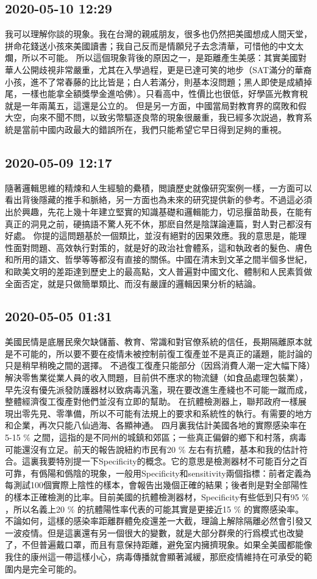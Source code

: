 \documentclass[twocolumn]{ctexart}
\begin{document}
\subsection*{2020-05-10 12:29}

我可以理解你談的現象。我在台灣的親戚朋友，很多也仍然把美國想成人間天堂，拼命花錢送小孩來美國讀書；我自己反而是情願兒子去念清華，可惜他的中文太爛，所以不可能。
所以這個現象背後的原因之一，是距離產生美感：其實美國對華人公開歧視非常嚴重，尤其在入學過程，更是已達可笑的地步（SAT滿分的華裔小孩，進不了常春藤的比比皆是；白人若滿分，則基本沒問題；黑人即使是成績掉尾，一樣也能拿全額獎學金進哈佛）。只看高中，性價比也很低，好學區光教育稅就是一年兩萬五，這還是公立的。
但是另一方面，中國當局對教育界的腐敗和假大空，向來不聞不問，以致劣幣驅逐良幣的現象很嚴重，我已經多次説過，教育系統是當前中國内政最大的錯誤所在，我們只能希望它早日得到足夠的重視。
\subsection*{2020-05-09 12:17}

隨著邏輯思維的精煉和人生經驗的纍積，閲讀歷史就像研究案例一樣，一方面可以看出背後隱藏的推手和脈絡，另一方面也為未來的研究提供新的參考。不過這必須出於興趣，先花上幾十年建立堅實的知識基礎和邏輯能力，切忌揠苗助長，在能有真正的洞見之前，硬搞語不驚人死不休，那麽自然是陰謀論連篇，對人對己都沒有好處。 
你提的這問題基於一個類比，並沒有絕對的因果效應。我的意思是，能理性面對問題、高效執行對策的，就是好的政治社會體系，這和執政者的髮色、膚色和所用的語文、哲學等等都沒有直接的關係。中國在清末到文革之間半個多世紀，和歐美文明的差距達到歷史上的最高點，文人普遍對中國文化、體制和人民素質做全面否定，就是只做簡單類比、而沒有嚴謹的邏輯因果分析的結論。
\subsection*{2020-05-05 01:31}

美國民情是底層民衆欠缺儲蓄、教育、常識和對官僚系統的信任，長期隔離原本就是不可能的，所以要不要在疫情未被控制前復工復產並不是真正的議題，能討論的只是稍早稍晚之間的選擇。
不過復工復產只能部分（因爲消費人潮一定大幅下降）解決零售業從業人員的收入問題，目前供不應求的物流鏈（如食品處理包裝業），早先沒有優先派發防護器材以致病毒汎濫，現在要改進生產綫也不可能一蹴而成，整體經濟復工復產對他們並沒有立即的幫助。
在抗體檢測器上，聯邦政府一樣展現出零先見、零準備，所以不可能有法規上的要求和系統性的執行。有需要的地方和企業，再次只能八仙過海、各顯神通。
四月裏我估計美國各地的實際感染率在5-15 \% 之間，這指的是不同州的城鎮和郊區；一些真正偏僻的鄉下和村落，病毒可能還沒有立足。前天的報告說紐約市民有20 \% 左右有抗體，基本和我的估計符合。這裏我要特別提一下Specificity的概念。它的意思是檢測器材不可能百分之百可靠，有僞陽和僞陰的現象，一般用Specificity和sensitivity兩個指標：前者定義為每測試100個實際上陰性的樣本，會報告出幾個正確的結果；後者則是對全部陽性的樣本正確檢測的比率。目前美國的抗體檢測器材，Specificity有些低到只有95 \% ，所以名義上20 \% 的抗體陽性率代表的可能其實是更接近15 \% 的實際感染率。
不論如何，這樣的感染率距離群體免疫還差一大截，理論上解除隔離必然會引發又一波疫情。但是這裏還有另一個很大的變數，就是大部分群衆的行爲模式也改變了，不但普遍戴口罩，而且有意保持距離，避免室内擁擠現象。如果全美國都能像我住的康州這一帶這樣小心，病毒傳播就會顯著減緩，那麽疫情維持在可承受的範圍内是完全可能的。
\end{document}
